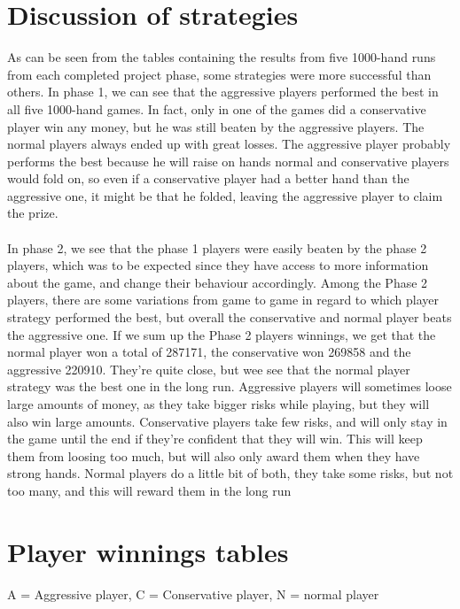 \documentclass[titlepage]{article}
\begin{document}
\section{Discussion of strategies}
    As can be seen from the tables containing the results from five 1000-hand runs from each completed project phase, some strategies were more successful than others. In phase 1, we can see that the aggressive players performed the best in all five 1000-hand games. In fact, only in one of the games did a conservative player win any money, but he was still beaten by the aggressive players. The normal players always ended up with great losses. The aggressive player probably performs the best because he will raise on hands normal and conservative players would fold on, so even if a conservative player had a better hand than the aggressive one, it might be that he folded, leaving the aggressive player to claim the prize. \\ \\ In phase 2, we see that the phase 1 players were easily beaten by the phase 2 players, which was to be expected since they have access to more information about the game, and change their behaviour accordingly. Among the Phase 2 players, there are some variations from game to game in regard to which player strategy performed the best, but overall the conservative and normal player beats the aggressive one. If we sum up the Phase 2 players winnings, we get that the normal player won a total of 287171, the conservative won 269858 and the aggressive 220910. They're quite close, but wee see that the normal player strategy was the best one in the long run. Aggressive players will sometimes loose large amounts of money, as they take bigger risks while playing, but they will also win large amounts. Conservative players take few risks, and will only stay in the game until the end if they're confident that they will win. This will keep them from loosing too much, but will also only award them when they have strong hands. Normal players do a little bit of both, they take some risks, but not too many, and this will reward them in the long run

\section{Player winnings tables}
    A = Aggressive player, C = Conservative player, N = normal player
\end{document}
